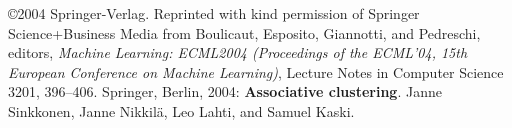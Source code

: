 \documentclass[12pt,onecolumn]{article}
\begin{document}
\noindent \copyright 2004 Springer-Verlag. Reprinted with kind
permission of Springer Science+Business Media from Boulicaut,
Esposito, Giannotti, and Pedreschi, editors, {\em Machine Learning:
ECML2004 (Proceedings of the ECML'04, 15th European Conference on
Machine Learning)}, Lecture Notes in Computer Science 3201, 396--406.
Springer, Berlin, 2004: {\bf Associative clustering}. Janne Sinkkonen,
Janne Nikkil{\"a}, Leo Lahti, and Samuel Kaski.
\end{document}
